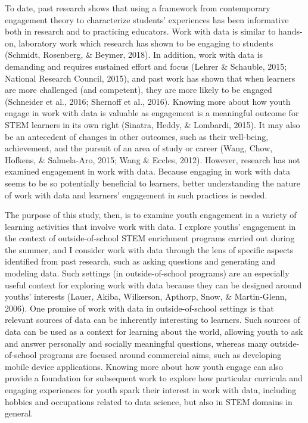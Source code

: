 \documentclass[]{msu-thesis}
\theoremstyle{definition}
\theoremstyle{definition}
\theoremstyle{definition}
\theoremstyle{remark}
\begin{document}
To date, past research shows that using a framework from contemporary
engagement theory to characterize students' experiences has been
informative both in research and to practicing educators. Work with data
is similar to hands-on, laboratory work which research has shown to be
engaging to students (Schmidt, Rosenberg, \& Beymer, 2018). In addition,
work with data is demanding and requires sustained effort and focus
(Lehrer \& Schauble, 2015; National Research Council, 2015), and past
work has shown that when learners are more challenged (and competent),
they are more likely to be engaged (Schneider et al., 2016; Shernoff et
al., 2016). Knowing more about how youth engage in work with data is
valuable as engagement is a meaningful outcome for STEM learners in its
own right (Sinatra, Heddy, \& Lombardi, 2015). It may also be an
antecedent of changes in other outcomes, such as their well-being,
achievement, and the pursuit of an area of study or career (Wang, Chow,
Hofkens, \& Salmela-Aro, 2015; Wang \& Eccles, 2012). However, research
has not examined engagement in work with data. Because engaging in work
with data seems to be so potentially beneficial to learners, better
understanding the nature of work with data and learners' engagement in
such practices is needed.

The purpose of this study, then, is to examine youth engagement in a
variety of learning activities that involve work with data. I explore
youths' engagement in the context of outside-of-school STEM enrichment
programs carried out during the summer, and I consider work with data
through the lens of specific aspects identified from past research, such
as asking questions and generating and modeling data. Such settings (in
outside-of-school programs) are an especially useful context for
exploring work with data because they can be designed around youths'
interests (Lauer, Akiba, Wilkerson, Apthorp, Snow, \& Martin-Glenn,
2006). One promise of work with data in outside-of-school settings is
that relevant sources of data can be inherently interesting to learners.
Such sources of data can be used as a context for learning about the
world, allowing youth to ask and answer personally and socially
meaningful questions, whereas many outside-of-school programs are
focused around commercial aims, such as developing mobile device
applications. Knowing more about how youth engage can also provide a
foundation for subsequent work to explore how particular curricula and
engaging experiences for youth spark their interest in work with data,
including hobbies and occupations related to data science, but also in
STEM domains in general.
\end{document}
